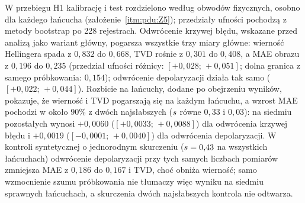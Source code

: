 W przebiegu H1 kalibrację i test rozdzielono według obwodów fizycznych, osobno dla każdego łańcucha (założenie~\ref{itm:pdu:Z5}); przedziały ufności pochodzą z metody bootstrap po 228 rejestrach.
Odwrócenie krzywej błędu, wskazane przed analizą jako wariant główny, pogarsza wszystkie trzy miary główne: wierność Hellingera spada z $0{,}832$ do $0{,}668$, TVD rośnie z $0{,}301$ do $0{,}408$, a MAE obrazu z $0{,}196$ do $0{,}235$ (przedział ufności różnicy: $[+0{,}028;\,+0{,}051]$; dolna granica z samego próbkowania: $0{,}154$); odwrócenie depolaryzacji działa tak samo ($[+0{,}022;\,+0{,}044]$).
Rozbicie na łańcuchy, dodane po obejrzeniu wyników, pokazuje, że wierność i TVD pogarszają się na każdym łańcuchu, a wzrost MAE pochodzi w około $90\%$ z dwóch najsłabszych ($s$ równe $0{,}33$ i $0{,}03$): na siedmiu pozostałych wynosi $+0{,}0060$ ($[+0{,}0033;\,+0{,}0088]$) dla odwrócenia krzywej błędu i $+0{,}0019$ ($[-0{,}0001;\,+0{,}0040]$) dla odwrócenia depolaryzacji.
W kontroli syntetycznej o jednorodnym skurczeniu ($s=0{,}43$ na wszystkich łańcuchach) odwrócenie depolaryzacji przy tych samych liczbach pomiarów zmniejsza MAE z $0{,}186$ do $0{,}167$ i TVD, choć obniża wierność; samo wzmocnienie szumu próbkowania nie tłumaczy więc wyniku na siedmiu sprawnych łańcuchach, a skurczenia dwóch najsłabszych kontrola nie odtwarza.
